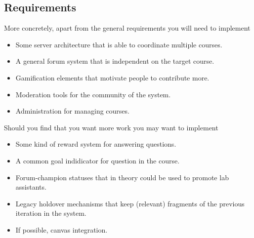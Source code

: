 \begin{refsection}
\subsection{Requirements}
More concretely, apart from the general requirements you will need to implement
\begin{itemize}
    \item Some server architecture that is able to coordinate multiple courses.
    \item A general forum system that is independent on the target course.
    \item Gamification elements that motivate people to contribute more.
    \item Moderation tools for the community of the system.
    \item Administration for managing courses.
\end{itemize}
Should you find that you want more work you may want to implement
\begin{itemize}
    \item Some kind of reward system for answering questions.
    \item A common goal indidicator for question in the course.
    \item Forum-champion statuses that in theory could be used to promote lab assistants.
    \item Legacy holdover mechanisms that keep (relevant) fragments of the previous iteration in the system.
    \item If possible, canvas integration.
\end{itemize}

\end{refsection}
